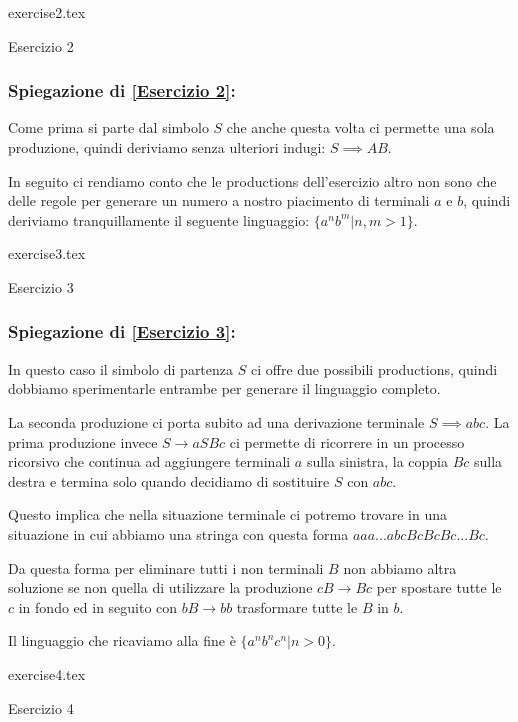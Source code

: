 \documentclass[class=book, crop=false, oneside]{standalone}
\begin{document}
\begin{table}[H]
	\centering
	{exercise2.tex}
    \caption{Esercizio 2}
    \label{Esercizio 2}
\end{table}
\subsubsection*{Spiegazione di \ref{Esercizio 2}:}
Come prima si parte dal simbolo $S$ che anche questa volta ci permette una sola produzione, quindi deriviamo senza ulteriori indugi: $S \implies AB$.

In seguito ci rendiamo conto che le productions dell'esercizio altro non sono che delle regole per generare un numero a nostro piacimento di terminali $a$ e $b$, quindi deriviamo tranquillamente il seguente linguaggio: $\{a^n b^m |n,m>1\}$.

\begin{table}[H]
	\centering
	{exercise3.tex}
    \caption{Esercizio 3}
    \label{Esercizio 3}
\end{table}
\subsubsection*{Spiegazione di \ref{Esercizio 3}:}
In questo caso il simbolo di partenza $S$ ci offre due possibili productions, quindi dobbiamo sperimentarle entrambe per generare il linguaggio completo.

La seconda produzione ci porta subito ad una derivazione terminale $S \implies abc$.
La prima produzione invece $S \to aSBc$ ci permette di ricorrere in un processo ricorsivo che continua ad aggiungere terminali $a$ sulla sinistra, la coppia $Bc$ sulla destra e termina solo quando decidiamo di sostituire $S$ con $abc$.

Questo implica che nella situazione terminale ci potremo trovare in una situazione in cui abbiamo una stringa con questa forma $aaa...abcBcBcBc...Bc$.

Da questa forma per eliminare tutti i non terminali $B$ non abbiamo altra soluzione se non quella di utilizzare la produzione $cB \to Bc$ per spostare tutte le $c$ in fondo ed in seguito con $bB \to bb$ trasformare tutte le $B$ in $b$.

Il linguaggio che ricaviamo alla fine è $\{a^nb^nc^n | n>0\}$.

\begin{table}[H]
	\centering
	{exercise4.tex}
    \caption{Esercizio 4}
    \label{Esercizio 4}
\end{table}
\end{document}
